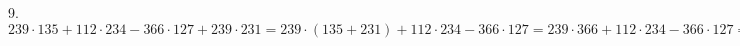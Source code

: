 9. $239\cdot135+112\cdot234-366\cdot127+239\cdot231=239\cdot(135+231)+112\cdot234-366\cdot127=239\cdot366+112\cdot234-366\cdot127=366\cdot(239-127)+112\cdot234=
366\cdot112+112\cdot234=112\cdot(366+234)=112\cdot600=67200.$\\
